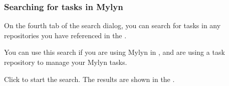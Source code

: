 \subsubsection{Searching for tasks in Mylyn}
\label{TasksSearchTasks}

On the fourth tab of the search dialog, you can search for tasks in any repositories you have referenced in the \gdproject{}.

You can use this search if you are using Mylyn in \app{}, and are using a task repository to manage your Mylyn tasks.

Click  to start the search. The results are shown in the \gdsearchresultview{} . 

